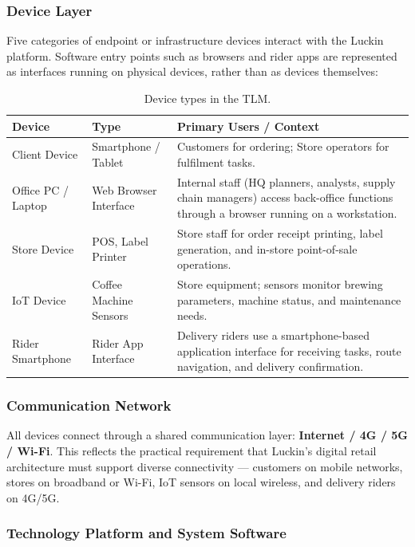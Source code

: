 \documentclass[12pt,a4paper]{article}
\begin{document}
\subsubsection{Device Layer}

Five categories of endpoint or infrastructure devices interact with the Luckin platform. Software entry points such as browsers and rider apps are represented as interfaces running on physical devices, rather than as devices themselves:

\begin{table}[H]
\centering
\caption{Device types in the TLM.}
\small
\begin{tabularx}{\textwidth}{P{3.2cm}P{3.0cm}Y}
\toprule
\textbf{Device} & \textbf{Type} & \textbf{Primary Users / Context} \\
\midrule
Client Device & Smartphone / Tablet & Customers for ordering; Store operators for fulfilment tasks. \\
Office PC / Laptop & Web Browser Interface & Internal staff (HQ planners, analysts, supply chain managers) access back-office functions through a browser running on a workstation. \\
Store Device & POS, Label Printer & Store staff for order receipt printing, label generation, and in-store point-of-sale operations. \\
IoT Device & Coffee Machine Sensors & Store equipment; sensors monitor brewing parameters, machine status, and maintenance needs. \\
Rider Smartphone & Rider App Interface & Delivery riders use a smartphone-based application interface for receiving tasks, route navigation, and delivery confirmation. \\
\bottomrule
\end{tabularx}
\end{table}

\subsubsection{Communication Network}

All devices connect through a shared communication layer: \textbf{Internet / 4G / 5G / Wi-Fi}. This reflects the practical requirement that Luckin's digital retail architecture must support diverse connectivity --- customers on mobile networks, stores on broadband or Wi-Fi, IoT sensors on local wireless, and delivery riders on 4G/5G.

\subsubsection{Technology Platform and System Software}
\end{document}
